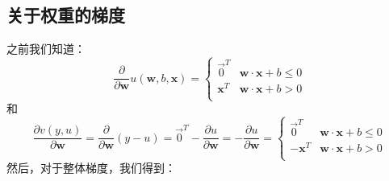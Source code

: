\documentclass[11pt]{article}
\begin{document}
\subsection{关于权重的梯度}\label{sec6.1}

之前我们知道：
\[\frac{\partial }{\partial \mathbf{w}} u(\mathbf{w},b,\mathbf{x}) = \begin{cases}
	\vec{0}^T & \mathbf{w} \cdot \mathbf{x} + b \leq 0\\
	\mathbf{x}^T & \mathbf{w} \cdot \mathbf{x} + b > 0\\
\end{cases}\]
和
\[\frac{\partial v(y,u)}{\partial \mathbf{w}} = \frac{\partial}{\partial \mathbf{w}} (y - u) = \vec{0}^T - \frac{\partial u}{\partial \mathbf{w}} = -\frac{\partial u}{\partial \mathbf{w}} = \begin{cases}
	\vec{0}^T & \mathbf{w} \cdot \mathbf{x} + b \leq 0\\
	-\mathbf{x}^T & \mathbf{w} \cdot \mathbf{x} + b > 0\\
\end{cases}\]
然后，对于整体梯度，我们得到：
\end{document}
